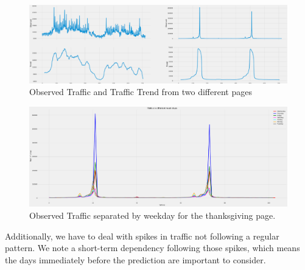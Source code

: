 \begin{figure}[h!]
  \includegraphics[width=\linewidth]{analysis1.png}
  \caption{Observed Traffic and Traffic Trend from two different pages}
  \label{fig:analysis1}
\end{figure}

\begin{figure}[h!]
	\includegraphics[width=\linewidth]{weekly_TK.png}
	\caption{Observed Traffic separated by weekday for the thanksgiving page.}
	\label{fig:thanksgiving}
\end{figure}

Additionally, we have to deal with spikes in traffic not following a regular pattern. We note a short-term dependency following those spikes, which means the days immediately before the prediction are important to consider.


